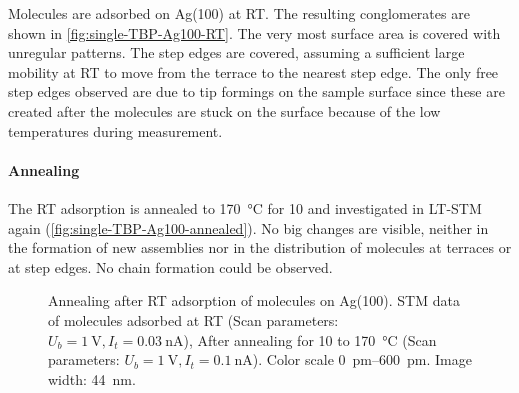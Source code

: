 \label{sec:single-TBP-Ag100}
Molecules are adsorbed on Ag(100) at RT. The resulting conglomerates are shown in \autoref{fig:single-TBP-Ag100-RT}. The very most surface area is covered with unregular patterns. The step edges are covered, assuming a sufficient large mobility at RT to move from the terrace to the nearest step edge. The only free step edges observed are due to tip formings on the sample surface since these are created after the molecules are stuck on the surface because of the low temperatures during measurement.
\paragraph{Annealing}
The RT adsorption is annealed to \SI{170}{\celsius} for \SI{10}{\min} and investigated in LT-STM again (\autoref{fig:single-TBP-Ag100-annealed}). No big changes are visible, neither in the formation of new assemblies nor in the distribution of molecules at terraces or at step edges. No chain formation could be observed.

\begin{figure}[] \centering
	\caption{Annealing after RT adsorption of molecules on Ag(100).  STM data of molecules adsorbed at RT (Scan parameters: $U_b=\SI{1}{\volt}, I_t=\SI{0,03}{\nano \ampere}$),  After annealing for \SI{10}{\min} to \SI{170}{\celsius} (Scan parameters: $U_b=\SI{1}{\volt}, I_t=\SI{0,1}{\nano \ampere}$). Color scale \SIrange{0}{600}{\pico\meter}. Image width: \SI{44}{\nm}.}
	\label{fig:single-TBP-Ag100-annealing}
\end{figure}

